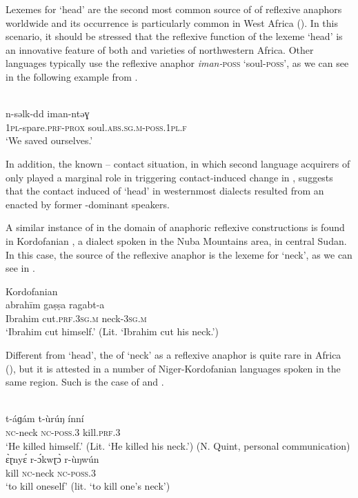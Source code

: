 \documentclass[output=paper]{langsci/langscibook}
\begin{document}
Lexemes for ‘head’ are the second most common source of  of reflexive anaphors worldwide \citep{KönigTöpper2013} and its occurrence is particularly common in West Africa (\citealt[50]{Heine2011}). In this scenario, it should be stressed that the reflexive function of the lexeme ‘head’ is an innovative feature of both  and  varieties of northwestern Africa. Other  languages typically use the reflexive anaphor \textit{iman-}\textsc{poss} ‘soul-\textsc{poss}’, as we can see in the following example from .

\ea
{ \citep{Mettouchi2012}}\\
\gll   n-səlk-dd       iman-ntəɣ\\
       \textsc{1pl}-spare.\textsc{prf-prox} soul.\textsc{abs.sg.m-poss.1pl.f}\\
\glt   `We saved ourselves.'\\
\z

In addition, the known – contact situation, in which second language acquirers of  only played a marginal role in triggering contact-induced change in , suggests that the contact induced  of ‘head’ in westernmost  dialects resulted from an  enacted by former -dominant speakers.  

A similar instance of  in the domain of anaphoric reflexive constructions is found in Kordofanian  , a  dialect spoken in the Nuba Mountains area, in central Sudan. In this case, the source of the reflexive anaphor is the lexeme for ‘neck’, as we can see in .  

\ea\label{20}
{Kordofanian   \citep[176]{Manfredi2010}}\\
\gll  abrahīm gaṣṣa ragabt-a\\
       Ibrahim cut.\textsc{prf.3sg.m} neck-\textsc{3sg.m}\\
\glt   `Ibrahim cut himself.' (Lit. `Ibrahim cut his neck.')
\z

Different from ‘head’, the  of ‘neck’ as a reflexive anaphor is quite rare in Africa (\citealt[50]{Heine2011}), but it is attested in a number of Niger-Kordofanian languages spoken in the same region. Such is the case of   and  . 

\ea\label{21}
{ \citep[26]{Alamin2015}}\\
\gll   t-áɡám t-ùrúŋ ínní\\
       \textsc{nc}-neck \textsc{nc}-\textsc{poss.3} kill.\textsc{prf.3}\\
\glt   `He killed himself.' (Lit. ‘He killed his neck.’)
\ex\label{22}
{ (N. Quint, personal communication)} \\
\gll   ɛ̀ɽnyɛ́ r-ɔ́kwɽɔ̀ r-ùŋwún\\
       kill \textsc{nc}-neck \textsc{nc-poss.3}\\
\glt   `to kill oneself' (lit. ‘to kill one's neck’)
\z
\end{document}
